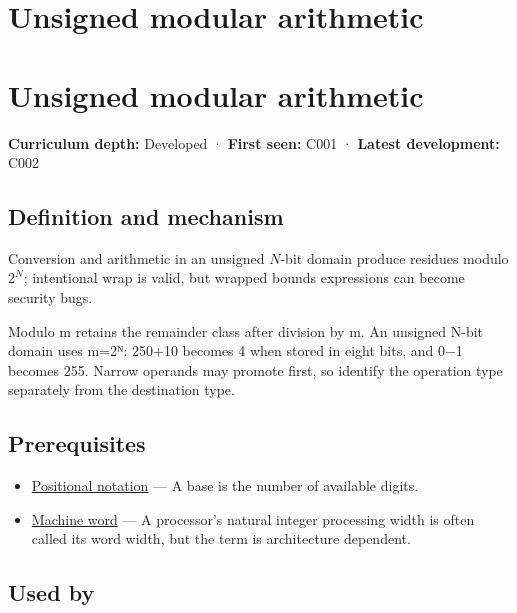 \hypertarget{appendix-c99977d88b33}{}
\section*{Unsigned modular arithmetic}
\section{Unsigned modular arithmetic}\label{appendix-c99977d88b33-unsigned-modular-arithmetic}

\textbf{Curriculum depth:} Developed · \textbf{First seen:} C001 · \textbf{Latest development:} C002

\subsection{Definition and mechanism}\label{appendix-c99977d88b33-definition-and-mechanism}

Conversion and arithmetic in an unsigned \(N\)-bit domain produce residues modulo \(2^N\); intentional wrap is valid, but wrapped bounds expressions can become security bugs.

Modulo m retains the remainder class after division by m. An unsigned N-bit domain uses m=2ᴺ: 250+10 becomes 4 when stored in eight bits, and 0−1 becomes 255. Narrow operands may promote first, so identify the operation type separately from the destination type.

\subsection{Prerequisites}\label{appendix-c99977d88b33-prerequisites}

\begin{itemize}
\tightlist
\item
  \hyperref[appendix-83c3f28f7bda]{Positional notation} --- A base is the number of available digits.
\item
  \hyperref[appendix-d67a19507dc5]{Machine word} --- A processor's natural integer processing width is often called its word width, but the term is architecture dependent.
\end{itemize}

\subsection{Used by}\label{appendix-c99977d88b33-used-by}

